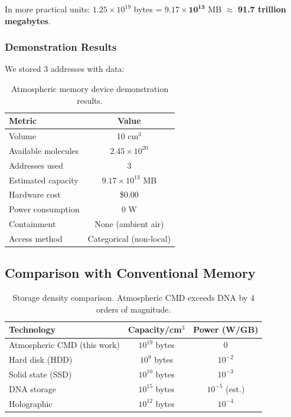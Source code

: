 In more practical units: $1.25 \times 10^{19}$ bytes = $\mathbf{9.17 \times 10^{13}}$ MB $\approx$ \textbf{91.7 trillion megabytes}.

\subsubsection{Demonstration Results}

We stored 3 addresses with data:

\begin{table}[h]
\centering
\begin{tabular}{|l|c|}
\hline
\textbf{Metric} & \textbf{Value} \\
\hline
Volume & 10 cm$^3$ \\
Available molecules & $2.45 \times 10^{20}$ \\
Addresses used & 3 \\
Estimated capacity & $9.17 \times 10^{13}$ MB \\
Hardware cost & \$0.00 \\
Power consumption & 0 W \\
Containment & None (ambient air) \\
Access method & Categorical (non-local) \\
\hline
\end{tabular}
\caption{Atmospheric memory device demonstration results.}
\end{table}

\subsection{Comparison with Conventional Memory}

\begin{table}[h]
\centering
\begin{tabular}{|l|c|c|}
\hline
\textbf{Technology} & \textbf{Capacity/cm$^3$} & \textbf{Power (W/GB)} \\
\hline
Atmospheric CMD (this work) & $10^{19}$ bytes & 0 \\
Hard disk (HDD) & $10^9$ bytes & $10^{-2}$ \\
Solid state (SSD) & $10^{10}$ bytes & $10^{-3}$ \\
DNA storage & $10^{15}$ bytes & $10^{-5}$ (est.) \\
Holographic & $10^{12}$ bytes & $10^{-4}$ \\
\hline
\end{tabular}
\caption{Storage density comparison. Atmospheric CMD exceeds DNA by 4 orders of magnitude.}
\end{table}

